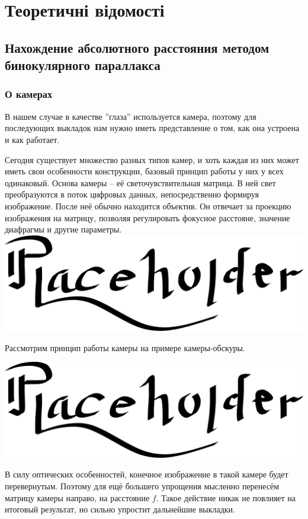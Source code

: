 \chapter{Теоретичні відомості}

\section{Нахождение абсолютного расстояния методом бинокулярного параллакса}
\subsection{О камерах}

В нашем случае в качестве ''глаза'' используется камера, поэтому для последующих выкладок нам нужно иметь представление о том, как она устроена и как работает.

Сегодня существует множество разных типов камер, и хоть каждая из них может иметь свои особенности конструкции, базовый принцип работы у них у всех одинаковый.
Основа камеры -- её светочувствительная матрица. В ней свет преобразуются в поток цифровых данных, непосредственно формируя изображение. После неё обычно находится объектив. Он отвечает за проекцию изображения на матрицу, позволяя регулировать фокусное расстояне, значение диафрагмы и другие параметры. 
	\includegraphics[scale = 0.75]{placeholder}
		
	Рассмотрим принцип работы камеры на примере камеры-обскуры. 
	
		\includegraphics[scale = 0.75]{placeholder}

В силу оптических особенностей, конечное изображение в такой камере будет перевернутым. Поэтому для ещё большего упрощения мысленно перенесём матрицу камеры направо, на расстояние $f$. Такое действие никак не повлияет на итоговый результат, но сильно упростит дальнейшие выкладки.

